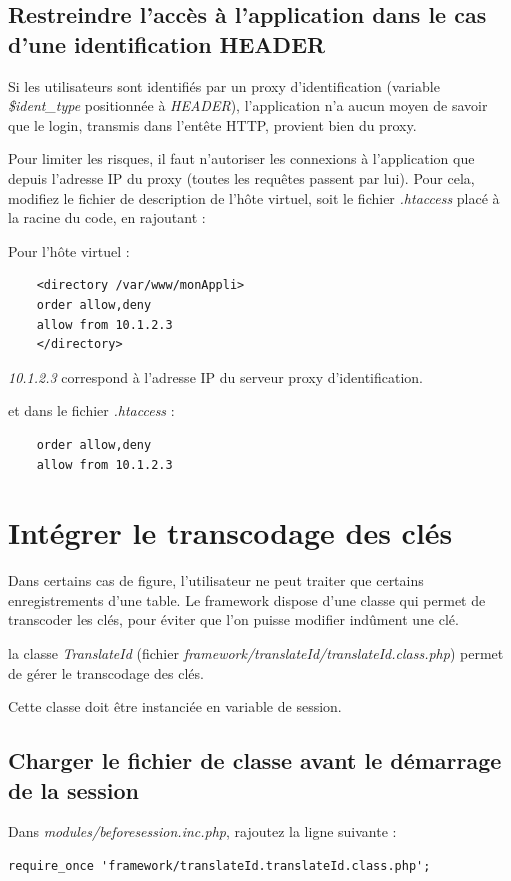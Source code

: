 \subsection{Restreindre l'accès à l'application dans le cas d'une identification HEADER}

Si les utilisateurs sont identifiés par un proxy d'identification (variable \textit{\$ident\_type} positionnée à \textit{HEADER}), l'application n'a aucun moyen de savoir que le login, transmis dans l'entête HTTP, provient bien du proxy.

Pour limiter les risques, il faut n'autoriser les connexions à l'application que depuis l'adresse IP du proxy (toutes les requêtes passent par lui). Pour cela, modifiez le fichier de description de l'hôte virtuel, soit le fichier \textit{.htaccess} placé à la racine du code, en rajoutant :

Pour l'hôte virtuel :
\begin{lstlisting}
    <directory /var/www/monAppli>
    order allow,deny
    allow from 10.1.2.3
    </directory>
\end{lstlisting} 
\textit{10.1.2.3} correspond à l'adresse IP du serveur proxy d'identification.

et dans le fichier \textit{.htaccess} :
\begin{lstlisting}
    order allow,deny
    allow from 10.1.2.3
\end{lstlisting}

\section{Intégrer le transcodage des clés}

Dans certains cas de figure, l'utilisateur ne peut traiter que certains enregistrements d'une table. Le framework dispose d'une classe qui permet de transcoder les clés, pour éviter que l'on puisse modifier indûment une clé.

la classe \textit{TranslateId} (fichier \textit{framework/translateId/translateId.class.php}) permet de gérer le transcodage des clés.

Cette classe doit être instanciée en variable de session.

\subsection{Charger le fichier de classe avant le démarrage de la session}

Dans \textit{modules/beforesession.inc.php}, rajoutez la ligne suivante :
\begin{lstlisting}
require_once 'framework/translateId.translateId.class.php';
\end{lstlisting}

